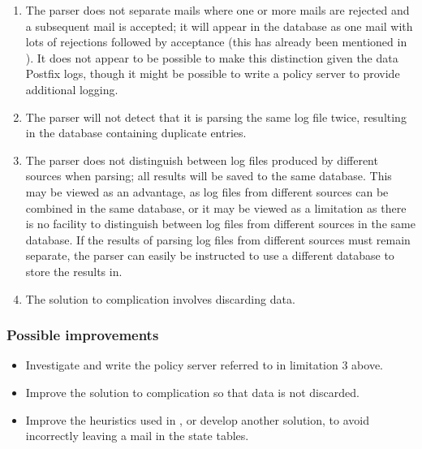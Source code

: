 \begin{enumerate}
    \item The parser does not separate mails where one or more mails are
        rejected and a subsequent mail is accepted; it will appear in the
        database as one mail with lots of rejections followed by acceptance
        (this has already been mentioned in ).
        It does not appear to be possible to make this distinction given
        the data Postfix logs, though it might be possible to write a
        policy server to provide additional logging.

    \item The parser will not detect that it is parsing the same log file
        twice, resulting in the database containing duplicate entries.

    \item The parser does not distinguish between log files produced by
        different sources when parsing; all results will be saved to the
        same database.  This may be viewed as an advantage, as log files
        from different sources can be combined in the same database, or it
        may be viewed as a limitation as there is no facility to
        distinguish between log files from different sources in the same
        database.  If the results of parsing log files from different
        sources must remain separate, the parser can easily be instructed
        to use a different database to store the results in.

    \item The solution to complication  involves discarding data.

\end{enumerate}

\subsubsection{Possible improvements}

\begin{itemize}

    \item Investigate and write the policy server referred to in limitation
        3 above.

    \item Improve the solution to complication  so that data is not discarded.

    \item Improve the heuristics used in
        , or develop another
        solution, to avoid incorrectly leaving a mail in the state tables.

\end{itemize}


